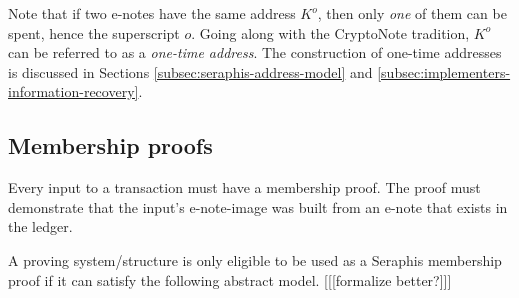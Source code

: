 Note that if two e-notes have the same address $K^o$, then only {\em one} of them can be spent, hence the superscript $o$. Going along with the CryptoNote tradition, $K^o$ can be referred to as a {\em one-time address}. The construction of one-time addresses is discussed in Sections \ref{subsec:seraphis-address-model} and \ref{subsec:implementers-information-recovery}.


\subsection{Membership proofs}
\label{subsec:seraphis-membership proofs}

Every input to a transaction must have a membership proof. The proof must demonstrate that the input's e-note-image was built from an e-note that exists in the ledger.

A proving system/structure is only eligible to be used as a Seraphis membership proof if it can satisfy the following abstract model. [[[formalize better?]]]


